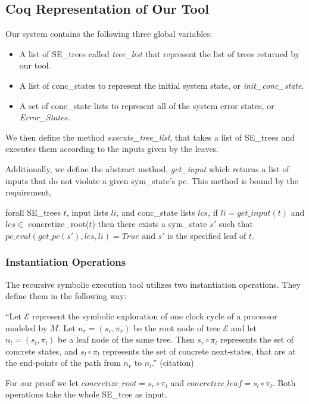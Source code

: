 \subsection{Coq Representation of Our Tool}
Our system contains the following three global variables:
\begin{itemize}
\item A list of SE\_trees called \textit{tree\_list} that represent the list of trees returned by our tool.
\item A list of conc\_states to represent the initial system state, or \textit{init\_conc\_state}.
\item A set of conc\_state lists to represent all of the system error states, or \textit{Error\_States}.
\end{itemize}

We then define the method \textit{execute\_tree\_list}, that takes a list of SE\_trees and executes them according to the inputs given by the leaves.

Additionally, we define the abstract method, \textit{get\_input} which returns a list of inputs that do not violate a given sym\_state's pc.
This method is bound by the requirement,
\begin{axiom}
forall SE\_trees $t$, input lists $li$, and conc\_state lists $lcs$,  
if $li = get\_input (t) $ and $lcs \in$ concretize\_root($t$)
then there exists a sym\_state $s'$ such that
 $pc\_eval (get\_pc (s'), lcs, li) = True$ and $s'$ is the specified leaf of $t$.
\end{axiom}

\subsubsection{Instantiation Operations}
The recursive symbolic execution tool utilizes two instantiation operations. 
They define them in the following way: 

``Let $\mathcal{E}$ represent the symbolic exploration of one clock cycle of a processor modeled by $M$. Let $n_r = (s_r,\pi_r)$ be the root node of tree $\mathcal{E}$ and let $n_l = (s_l,\pi_l)$ be a leaf node of the same tree. 
Then $s_r \circ \pi_l$ represents the set of concrete states, and $s_l \circ \pi_l$ represents the set of concrete next-states, that are at the end-points of the path from $n_r$ to $n_l$.'' (citation)

For our proof we let $concretize\_root=  s_r \circ \pi_l$ and $concretize\_leaf =  s_l \circ \pi_l$.
Both operations take the whole SE\_tree as input.

